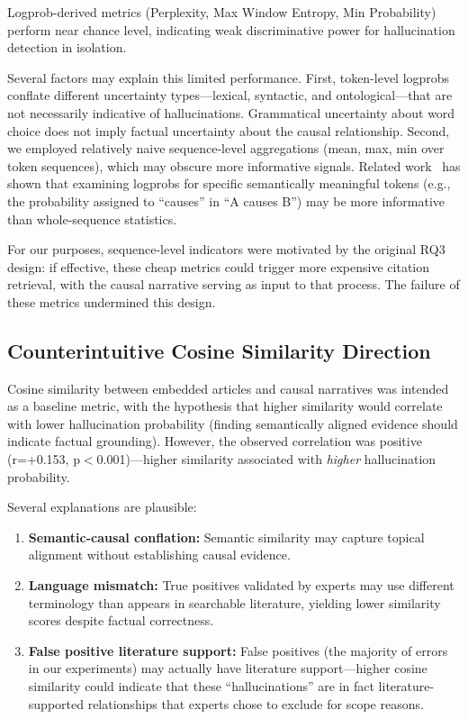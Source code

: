 Logprob-derived metrics (Perplexity, Max Window Entropy, Min Probability) perform near chance level, indicating weak discriminative power for hallucination detection in isolation.

Several factors may explain this limited performance. First, token-level logprobs conflate different uncertainty types---lexical, syntactic, and ontological---that are not necessarily indicative of hallucinations. Grammatical uncertainty about word choice does not imply factual uncertainty about the causal relationship. Second, we employed relatively naive sequence-level aggregations (mean, max, min over token sequences), which may obscure more informative signals. Related work~\citep{Waaijers2024theoraizer} has shown that examining logprobs for specific semantically meaningful tokens (e.g., the probability assigned to ``causes'' in ``A causes B'') may be more informative than whole-sequence statistics.

For our purposes, sequence-level indicators were motivated by the original RQ3 design: if effective, these cheap metrics could trigger more expensive citation retrieval, with the causal narrative serving as input to that process. The failure of these metrics undermined this design.

\subsection{Counterintuitive Cosine Similarity Direction}
\label{sec:cosine_paradox}

Cosine similarity between embedded articles and causal narratives was intended as a baseline metric, with the hypothesis that higher similarity would correlate with lower hallucination probability (finding semantically aligned evidence should indicate factual grounding). However, the observed correlation was positive (r=+0.153, p$<$0.001)---higher similarity associated with \textit{higher} hallucination probability.

Several explanations are plausible:
\begin{enumerate}[noitemsep]
    \item \textbf{Semantic-causal conflation:} Semantic similarity may capture topical alignment without establishing causal evidence.
    \item \textbf{Language mismatch:} True positives validated by experts may use different terminology than appears in searchable literature, yielding lower similarity scores despite factual correctness.
    \item \textbf{False positive literature support:} False positives (the majority of errors in our experiments) may actually have literature support---higher cosine similarity could indicate that these ``hallucinations'' are in fact literature-supported relationships that experts chose to exclude for scope reasons.
\end{enumerate}

